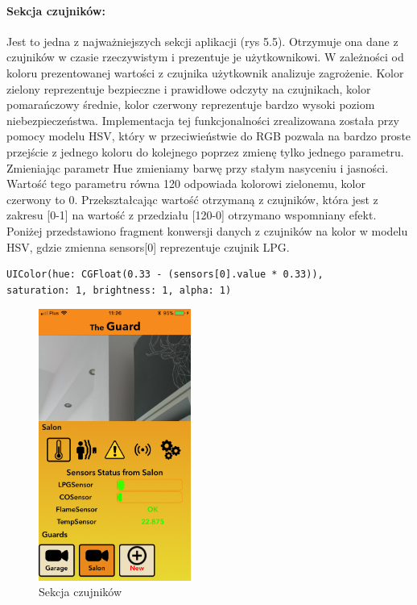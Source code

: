 \paragraph{Sekcja czujników:}
Jest to jedna z najważniejszych sekcji aplikacji (rys 5.5).  Otrzymuje ona dane z czujników w czasie rzeczywistym i prezentuje je użytkownikowi.  W zależności od koloru prezentowanej wartości z czujnika użytkownik analizuje zagrożenie. Kolor zielony reprezentuje bezpieczne i prawidłowe odczyty na czujnikach, kolor pomarańczowy średnie, kolor czerwony reprezentuje bardzo wysoki poziom niebezpieczeństwa. Implementacja tej funkcjonalności zrealizowana została przy pomocy modelu HSV, który w przeciwieństwie do RGB pozwala na bardzo proste przejście z jednego koloru do kolejnego poprzez zmienę tylko jednego parametru. Zmieniając parametr Hue zmieniamy barwę przy stałym nasyceniu i jasności. Wartość tego parametru równa 120\textdegree{} odpowiada kolorowi zielonemu, kolor czerwony to 0\textdegree{}. Przekształcając wartość otrzymaną z czujników, która jest z zakresu [0-1] na wartość z przedziału [120-0] otrzymano wspomniany efekt. 
Poniżej przedstawiono fragment konwersji danych z czujników na kolor w modelu HSV, gdzie zmienna sensors[0] reprezentuje czujnik LPG.
\begin{verbatim}
UIColor(hue: CGFloat(0.33 - (sensors[0].value * 0.33)),
saturation: 1, brightness: 1, alpha: 1)
\end{verbatim}
\begin{figure}[ht]
	\centering
	\includegraphics[width=5cm]{ios_screenshots/sensors.png}
	\caption{Sekcja czujników}
\end{figure}
